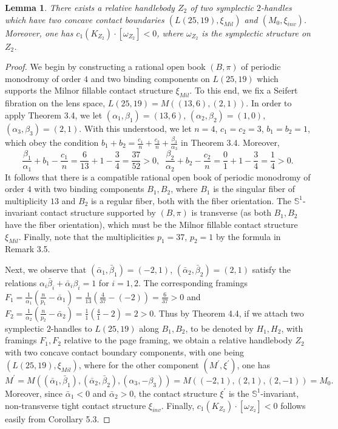 \documentclass[11pt]{amsart}
\theoremstyle{plain}
\numberwithin{theorem}{section}
\newtheorem{lemma}[theorem]{Lemma}
\theoremstyle{definition}
\newcommand{\s}{{\mathbb S}}
\begin{document}
\begin{lemma}
There exists a relative handlebody $Z_2$ of two symplectic $2$-handles which have two concave
contact boundaries $(L(25,19),\xi_{Mil})$ and $(M_0,\xi_{inv})$. Moreover,  one has $c_1(K_{Z_2})\cdot [\omega_{Z_2}]<0$, where $\omega_{Z_2}$ is the symplectic structure on $Z_2$. 
\end{lemma}

\begin{proof}
We begin by constructing a rational open book $(B,\pi)$ of periodic monodromy of order $4$ and two binding components on $L(25,19)$ which supports the Milnor fillable contact structure $\xi_{Mil}$. To this end, we fix a 
Seifert fibration on the lens space, $L(25,19)=M((13,6), (2,1))$. In order to apply Theorem 3.4, we let 
$(\alpha_1,\beta_1)=(13,6)$, $(\alpha_2,\beta_2)=(1,0)$, $(\alpha_3,\beta_3)=(2,1)$. With this understood, 
we let $n=4$, $c_1=c_2=3$, $b_1=b_2=1$, which obey the condition $b_1+b_2=\frac{c_1}{n}+\frac{c_2}{n}+\frac{\beta_3}{\alpha_3}$ in Theorem 3.4. Moreover,
$$
\frac{\beta_1}{\alpha_1}+b_1-\frac{c_1}{n}=\frac{6}{13}+1-\frac{3}{4}=\frac{37}{52}>0, \;\;
\frac{\beta_2}{\alpha_2}+b_2-\frac{c_2}{n}=\frac{0}{1}+1-\frac{3}{4}=\frac{1}{4}>0.
$$
It follows that there is a compatible rational open book of periodic monodromy of order $4$ with two binding components $B_1,B_2$, where $B_1$ is the singular fiber of multiplicity $13$ and $B_2$ is
a regular fiber, both with the fiber orientation. The $\s^1$-invariant contact structure supported by
$(B,\pi)$ is transverse (as both $B_1,B_2$ have the fiber orientation), which must be the Milnor fillable contact structure $\xi_{Mil}$. Finally, note that the multiplicities $p_1=37$, $p_2=1$ by the formula in Remark 3.5.

Next, we observe that $(\bar{\alpha}_1, \bar{\beta}_1)=(-2,1)$, 
$(\bar{\alpha}_2, \bar{\beta}_2)=(2,1)$ satisfy the relations $\alpha_i\bar{\beta}_i+\bar{\alpha}_i\beta_i=1$ for $i=1,2$. The corresponding framings $F_1=\frac{1}{\alpha_1}(\frac{n}{p_1}-\bar{\alpha}_1)=\frac{1}{13}(\frac{4}{37}-(-2))=\frac{6}{37}>0$ and $F_2=\frac{1}{\alpha_2}(\frac{n}{p_2}-\bar{\alpha}_2)=\frac{1}{1}(\frac{4}{1}-2)=2>0$. Thus by Theorem 4.4, if we attach two symplectic $2$-handles to $L(25,19)$ along $B_1, B_2$, to be denoted by $H_1,H_2$, with framings $F_1,F_2$ relative to the page framing, we obtain a relative handlebody $Z_2$ with two concave contact boundary components, with one being $(L(25,19),\xi_{Mil})$, where for the other component 
$(M^\prime,\xi^\prime)$, one has 
$$
M^\prime=M((\bar{\alpha}_1,\bar{\beta}_1), (\bar{\alpha}_2,\bar{\beta}_2), (\alpha_3,-\beta_3))=
M((-2,1), (2,1), (2,-1))=M_0.
$$
Moreover, since $\bar{\alpha}_1<0$ and $\bar{\alpha}_2>0$, the contact structure $\xi^\prime$ is 
the $\s^1$-invariant, non-transverse tight contact structure $\xi_{inv}$.
Finally, $c_1(K_{Z_2})\cdot [\omega_{Z_2}]<0$ follows easily from Corollary 5.3. 

\end{proof}
\end{document}
